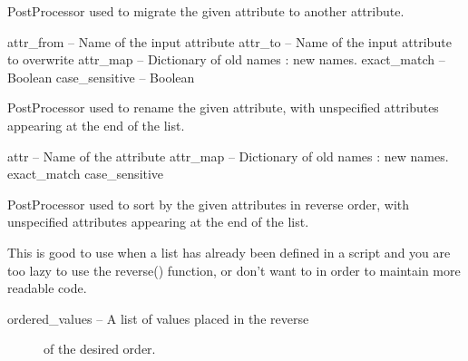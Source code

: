 \documentclass[letterpaper,10pt,english]{sphinxmanual}
\begin{document}

\begin{fulllineitems}
\label{index:omgeo.processors.postprocessors.AttrMigrator}
PostProcessor used to migrate the given attribute
to another attribute.

attr\_from       -- Name of the input attribute
attr\_to         -- Name of the input attribute to overwrite
attr\_map        -- Dictionary of old names : new names.
exact\_match     -- Boolean
case\_sensitive  -- Boolean

\end{fulllineitems}


\begin{fulllineitems}
\label{index:omgeo.processors.postprocessors.AttrRename}
PostProcessor used to rename the given attribute, with unspecified
attributes appearing at the end of the list.

attr            -- Name of the attribute
attr\_map        -- Dictionary of old names : new names.
exact\_match
case\_sensitive

\end{fulllineitems}


\begin{fulllineitems}
\label{index:omgeo.processors.postprocessors.AttrReverseSorter}
PostProcessor used to sort by the given attributes in reverse order,
with unspecified attributes appearing at the end of the list.

This is good to use when a list has already been defined in a script
and you are too lazy to use the reverse() function, or don't want
to in order to maintain more readable code.
\begin{description}
\item[{ordered\_values   -- A list of values placed in the reverse }] \leavevmode
of the desired order.

\end{description}

\end{fulllineitems}
\end{document}
